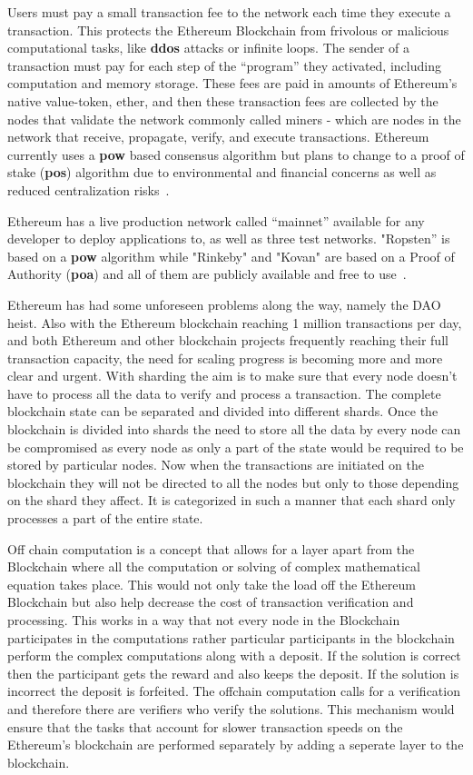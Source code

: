 Users must pay a small transaction fee to the network each time they execute a transaction. This protects the Ethereum Blockchain from frivolous or malicious computational tasks, like \textbf{ddos} attacks or infinite loops. The sender of a transaction must pay for each step of the “program” they activated, including computation and memory storage. These fees are paid in amounts of Ethereum’s native value-token, ether, and then these transaction fees are collected by the nodes that validate the network commonly called miners - which are nodes in the network that receive, propagate, verify, and execute transactions. Ethereum currently uses a \textbf{pow} based consensus algorithm but plans to change to a proof of stake (\textbf{pos}) algorithm due to environmental and financial concerns as well as reduced centralization risks~\cite{EthereumDocs2018,EthereumPOSFAQ2018}.

Ethereum has a live
production network called “mainnet” available for any developer to deploy applications to,
as well as three test networks. "Ropsten” is based on a \textbf{pow} algorithm while "Rinkeby" and "Kovan" are based on a Proof of Authority (\textbf{poa}) and all of them are publicly available and free to use~\cite{Barclay2017,EthereumTestNetworks2018}.

Ethereum has had some unforeseen problems along the way, namely the DAO heist. Also with the Ethereum blockchain reaching 1 million transactions per day, and both Ethereum and other blockchain projects frequently reaching their full transaction capacity, the need for scaling progress is becoming more and more clear and urgent. With sharding the aim is to make sure that every node doesn’t have to process all the data to verify and process a transaction. The complete blockchain state can be separated and divided into different shards. Once the blockchain is divided into shards the need to store all the data by every node can be compromised as every node as only a part of the state would be required to be stored by particular nodes. Now when the transactions are initiated on the blockchain they will not be directed to all the nodes but only to those depending on the shard they affect. It is categorized in such a manner that each shard only processes a part of the entire state.

Off chain computation is a concept that allows for a layer apart from the Blockchain where all the computation or solving of complex mathematical equation takes place. This would not only take the load off the Ethereum Blockchain but also help decrease the cost of transaction verification and processing. This works in a way that not every node in the Blockchain participates in the computations rather particular participants in the blockchain perform the complex computations along with a deposit. If the solution is correct then the participant gets the reward and also keeps the deposit. If the solution is incorrect the deposit is forfeited. The offchain computation calls for a verification and therefore there are verifiers who verify the solutions. This mechanism would ensure that the tasks that account for slower transaction speeds on the Ethereum’s blockchain are performed separately by adding a seperate layer to the blockchain. 

